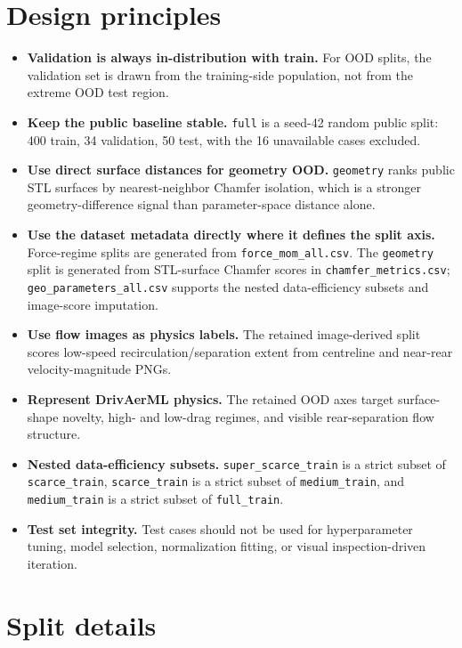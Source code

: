 \documentclass[10pt]{article}
\newcommand{\code}[1]{\texttt{#1}}
\newcommand{\splitkey}[1]{\texttt{#1}}
\begin{document}
\section*{Design principles}

\begin{itemize}
  \item \textbf{Validation is always in-distribution with train.} For OOD splits, the validation set is drawn from the training-side population, not from the extreme OOD test region.
  \item \textbf{Keep the public baseline stable.} \splitkey{full} is a seed-42 random public split: 400 train, 34 validation, 50 test, with the 16 unavailable cases excluded.
  \item \textbf{Use direct surface distances for geometry OOD.} \splitkey{geometry} ranks public STL surfaces by nearest-neighbor Chamfer isolation, which is a stronger geometry-difference signal than parameter-space distance alone.
  \item \textbf{Use the dataset metadata directly where it defines the split axis.} Force-regime splits are generated from \code{force\_mom\_all.csv}. The \splitkey{geometry} split is generated from STL-surface Chamfer scores in \code{chamfer\_metrics.csv}; \code{geo\_parameters\_all.csv} supports the nested data-efficiency subsets and image-score imputation.
  \item \textbf{Use flow images as physics labels.} The retained image-derived split scores low-speed recirculation/separation extent from centreline and near-rear velocity-magnitude PNGs.
  \item \textbf{Represent DrivAerML physics.} The retained OOD axes target surface-shape novelty, high- and low-drag regimes, and visible rear-separation flow structure.
  \item \textbf{Nested data-efficiency subsets.} \splitkey{super\_scarce\_train} is a strict subset of \splitkey{scarce\_train}, \splitkey{scarce\_train} is a strict subset of \splitkey{medium\_train}, and \splitkey{medium\_train} is a strict subset of \splitkey{full\_train}.
  \item \textbf{Test set integrity.} Test cases should not be used for hyperparameter tuning, model selection, normalization fitting, or visual inspection-driven iteration.
\end{itemize}

\section*{Split details}
\end{document}
